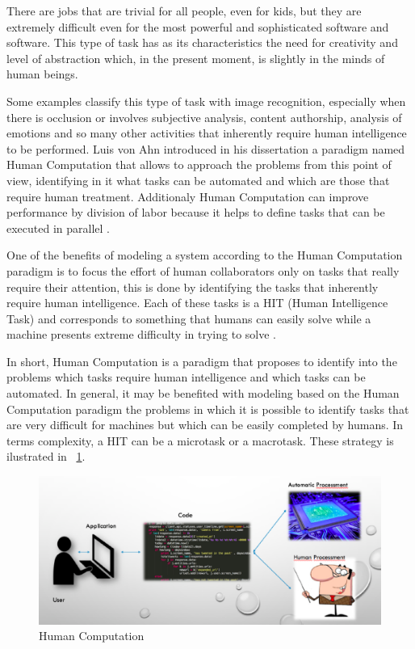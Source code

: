 There are jobs that are trivial for all people, even for kids, but they are extremely difficult even for the most powerful and sophisticated software and software. This type of task has as its characteristics the need for creativity and level of abstraction which, in the present moment, is slightly in the minds of human beings. 

Some examples classify this type of task with image recognition, especially when there is occlusion or involves subjective analysis, content authorship, analysis of emotions and so many other activities that inherently require human intelligence to be performed. Luis von Ahn introduced in his dissertation  \cite{VonAhn:2005:HC:1168246}  a paradigm named Human Computation that allows to approach the problems from this point of view, identifying in it what tasks can be automated and which are those that require human treatment. Additionaly Human Computation can improve performance by division of labor because it helps to define tasks that can be executed in parallel \cite{Rohwer:2010:NHC:1837885.1837897}.

One of the benefits of modeling a system according to the Human Computation paradigm is to focus the effort of human collaborators only on tasks that really require their attention, this is done by identifying the tasks that inherently require human intelligence. Each of these tasks is a HIT (Human Intelligence Task) and corresponds to something that humans can easily solve while a machine presents extreme difficulty in trying to solve \cite{doi:10.2200/S00371ED1V01Y201107AIM013}. 

In short, Human Computation is a paradigm that proposes to identify into the problems which tasks require human intelligence and which tasks can be automated. In general, it may be benefited with modeling based on the Human Computation paradigm the problems in which it is possible to identify tasks that are very difficult for machines but which can be easily completed by humans. In terms complexity, a HIT can be a microtask or a macrotask. These strategy is ilustrated in ~\ref{hc}.

\begin{figure}[ht]
\centering
\includegraphics[scale=0.3]{figure/hc}
\caption{Human Computation}
\label{hc}
\end{figure}

